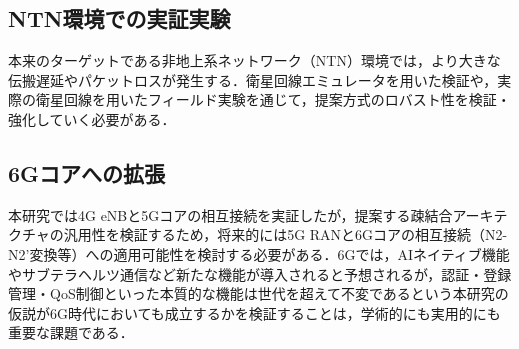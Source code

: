\subsection{NTN環境での実証実験}
本来のターゲットである非地上系ネットワーク（NTN）環境では，より大きな伝搬遅延やパケットロスが発生する．衛星回線エミュレータを用いた検証や，実際の衛星回線を用いたフィールド実験を通じて，提案方式のロバスト性を検証・強化していく必要がある．

\subsection{6Gコアへの拡張}
本研究では4G eNBと5Gコアの相互接続を実証したが，提案する疎結合アーキテクチャの汎用性を検証するため，将来的には5G RANと6Gコアの相互接続（N2-N2'変換等）への適用可能性を検討する必要がある．6Gでは，AIネイティブ機能やサブテラヘルツ通信など新たな機能が導入されると予想されるが，認証・登録管理・QoS制御といった本質的な機能は世代を超えて不変であるという本研究の仮説が6G時代においても成立するかを検証することは，学術的にも実用的にも重要な課題である．
